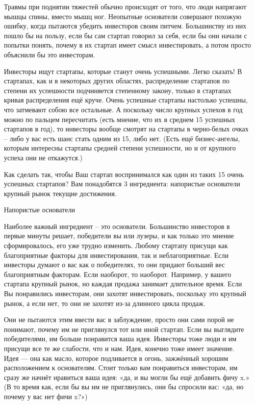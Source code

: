 \documentclass[ebook,12pt,oneside,openany]{memoir}
\date{}
\begin{document}
\maketitle

Травмы при поднятии тяжестей обычно происходят от того, что люди
напрягают мышцы спины, вместо мышц ног. Неопытные основатели совершают
похожую ошибку, когда пытаются убедить инвесторов своим питчем.
Большинству из них пошло бы на пользу, если бы сам стартап говорил за
себя, если бы они начали с попытки понять, почему в их стартап имеет
смысл инвестировать, а потом просто объяснили бы это инвесторам.

Инвесторы ищут стартапы, которые станут очень успешными. Легко
сказать! В стартапах, как и в некоторых других областях, распределение
стартапов по степени их успешности подчиняется степенному закону,
только в стартапах кривая распределения ещё круче. Очень успешные
стартапы настолько успешны, что затмевают собою все остальные. А
поскольку число крупных успехов в год можно по пальцем пересчитать
(есть мнение, что их в среднем 15 успешных стартапов в год), то
инвесторы вообще смотрят на стартапы в черно-белых очках – либо у вас
есть шанс стать одним из 15, либо нет. (Есть ещё бизнес-ангелы,
которым интересны стартапы средней степени успешности, но и от
крупного успеха они не откажутся.)

Как сделать так, чтобы Ваш стартап воспринимался как один из таких 15
очень успешных стартапов? Вам понадобятся 3 ингредиента: напористые
основатели крупный рынок текущие достижения.


Напористые основатели

Наиболее важный ингредиент – это основатели. Большинство инвесторов в
первые минуты решает, победители вы или лузеры, и как только это
мнение сформировалось, его уже трудно изменить. Любому стартапу
присущи как благоприятные факторы для инвестирования, так и
неблагоприятные. Если инвесторы думают о вас как о победителях, то они
придают больший вес благоприятным факторам. Если наоборот, то
наоборот. Например, у вашего стартапа крупный рынок, но каждая продажа
занимает длительное время. Если Вы понравились инвесторам, они захотят
инвестировать, поскольку это крупный рынок, а если нет, то они не
захотят из-за длинного цикла продаж.

Они не пытаются этим ввести вас в заблуждение, просто они сами порой
не понимают, почему им не приглянулся тот или иной стартап. Если вы
выглядите победителями, им больше понравится ваша идея. Инвесторы тоже
люди и им присущи все те же слабости, что и нам. Идея, конечно тоже
имеет значение. Идея — она как масло, которое подливается в огонь,
зажжённый хорошим расположением к основателям. Стоит только вам
понравиться инвесторам, им сразу же начнёт нравиться ваша идея: «да, и
вы могли бы ещё добавить фичу x.» (В то время как, если бы вы им не
приглянулись, они бы спросили вас: «да, но почему у вас нет фичи x?»)
\end{document}
